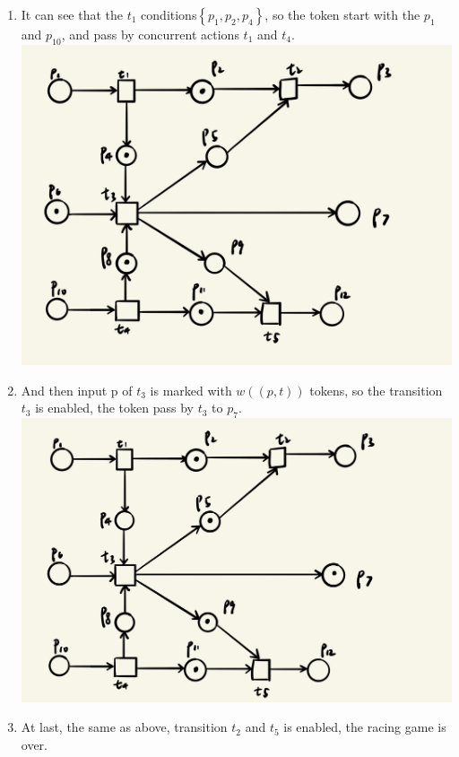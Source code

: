 \documentclass[runningheads]{llncs}
\begin{document}
\begin{enumerate}
    \item It can see that the $t_1$ conditions$\left\{p_1,p_2,p_4\right\}$, so the token start with the $p_1$ and $p_{10}$, and pass by concurrent actions $t_1$ and $t_4$.\\ 
    \includegraphics[scale=0.15]{token1.jpeg}
    \item And then input p of $t_3$ is marked with $w((p,t))$ tokens, so the transition $t_3$ is enabled, the token pass by $t_3$ to $p_7$.\\
    \includegraphics[scale=0.15]{token2.jpeg}
    \item At last, the same as above, transition $t_2$ and $t_5$ is enabled, the racing game is over.\\

\end{enumerate}
\end{document}
